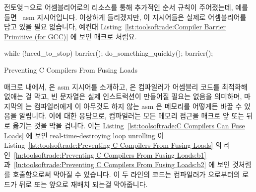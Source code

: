 {{{{전토엊ㄱ으로 어셈블리어로의 리소스를 통해 추가적인 순서 규칙이 주어졌는데, 예를
들면 \GCC\ asm 지시어입니다.
이상하게 들리겠지만, 이 지시어들은 실제로 어셈블리어를 담고 있을 필요 없습니다,
예컨대 Listing~\ref{lst:toolsoftrade:Compiler Barrier Primitive (for GCC)} 에
보인  매크로 처럼요.

\begin{listing}[tbp]
\begin{linelabel}
\begin{VerbatimL}[commandchars=\\\[\]]
while (!need_to_stop) {
	barrier(); \lnlbl[b1]
	do_something_quickly();
	barrier(); \lnlbl[b2]
}
\end{VerbatimL}
\end{linelabel}
\caption{Preventing C Compilers From Fusing Loads}
\label{lst:toolsoftrade:Preventing C Compilers From Fusing Loads}
\end{listing}

 매크로 내에서,  은 asm 지시어를 소개하고,
 은 컴파일러가 어셈블리 코드를 최적화해 없애는 걸 막고, 빈
문자열은 실제 인스트럭션이 만들어질 필요는 없음을 의미하며, 마지막의
 는 컴파일러에게 이 아무것도 하지 않는 asm 은 메모리를 어떻게든
바꿀 수 있음을 알립니다.
이에 대한 응답으로, 컴파일러는 모든 메모리 접근을  매크로 앞 또는 뒤로 옮기는 것을 막을 겁니다.
이는
Listing~\ref{lst:toolsoftrade:C Compilers Can Fuse Loads}
에 보인 real-time-destroying loop unrolling 이
Listing~\ref{lst:toolsoftrade:Preventing C Compilers From Fusing Loads} 의
라인~\ref{ln:toolsoftrade:Preventing C Compilers From Fusing Loads:b1}
과~\ref{ln:toolsoftrade:Preventing C Compilers From Fusing Loads:b2}
에 보인 것처럼  를 호출함으로써 막아질 수 있습니다.
이 두 라인의 코드는 컴파일러가  으로부터의 로드가
 뒤로 또는 앞으로 재배치 되는걸 막아줍니다.
\iffalse

}}}}
